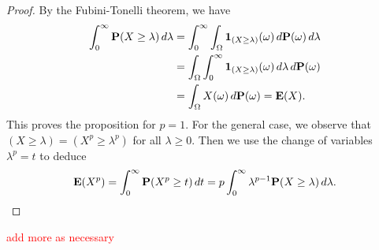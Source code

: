 \begin{proof}
	By the Fubini-Tonelli theorem, we have
	\begin{align*}
		\int_0^\infty \mathbf{P}(X\ge\lambda)\,d\lambda &= \int_0^\infty \int_\Omega \mathbf{1}_{(X\ge\lambda)}(\omega)\,d\mathbf{P}(\omega)\,d\lambda \\
		&= \int_\Omega \int_0^\infty \mathbf{1}_{(X\ge\lambda)}(\omega)\,d\lambda\,d\mathbf{P}(\omega) \\
		&= \int_\Omega X(\omega)\,d\mathbf{P}(\omega) = \mathbf{E}(X).
	\end{align*}
	This proves the proposition for $p=1$. For the general case, we observe that $(X\ge\lambda)=(X^p\ge\lambda^p)$ for all $\lambda\ge 0$. Then we use the change of variables $\lambda^p=t$ to deduce
	\begin{equation*}
		\mathbf{E}(X^p) = \int_0^\infty \mathbf{P}(X^p\ge t)\,dt = p\int_0^\infty \lambda^{p-1}\mathbf{P}(X\ge\lambda)\,d\lambda. \qedhere
	\end{equation*}
\end{proof}

\textcolor{red}{add more as necessary}